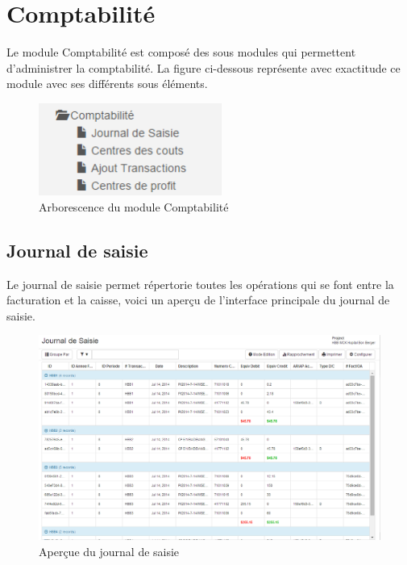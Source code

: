 \documentclass[12pt,a4paper]{report}
\begin{document}
\newpage
\chapter{Comptabilité}        
Le module Comptabilité est composé des sous modules qui permettent d'administrer la comptabilité. La figure ci-dessous représente avec exactitude ce module avec ses différents sous éléments.

\begin{figure}[h]
\begin{center}
\includegraphics[width=6cm]{pic/ArboCompta.png}
\end{center}
\caption{Arborescence du module Comptabilité}
\label{Arborescence du module Comptabilité}
\end{figure}

\section{Journal de saisie}
Le journal de saisie  permet répertorie toutes les opérations qui se font entre la facturation et la caisse, voici un aperçu de l'interface principale du journal de saisie.

\begin{figure}[h]
\begin{center}
\includegraphics[width=14cm]{pic/JournalSaisie.png}
\end{center}
\caption{Aperçue du journal de saisie}
\label{Aperçue du journal de saisie}
\end{figure}
\end{document}
